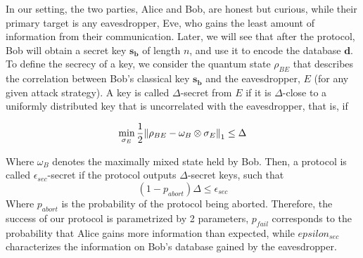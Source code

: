 \documentclass[%
 reprint,
superscriptaddress,
 amsmath,amssymb,
 aps,
]{revtex4-2}
\begin{document}
In our setting, the two parties, Alice and Bob, are honest but curious, while their primary target is any eavesdropper, Eve, who gains the least amount of information from their communication. Later, we will see that after the protocol, Bob will obtain a secret key $\mathbf{s_b}$ of length $n$, and use it to encode the database $\mathbf{d}$. To define the secrecy of a key, we consider the quantum state $\rho_{BE}$ that describes the correlation between Bob’s classical key $\mathbf{s_b}$ and the eavesdropper, $E$ (for any given attack strategy). A key is called $\Delta$-secret from $E$ if it is $\Delta$-close to a uniformly distributed key that is uncorrelated with the eavesdropper, that is, if

\begin{equation}
    \min_{\sigma_E}\frac{1}{2}\norm{\rho_{BE}-\omega_B\otimes\sigma_E}_1\le\Delta
\end{equation}

Where $\omega_B$ denotes the maximally mixed state held by Bob. Then, a protocol is called $\epsilon_{sec}$-secret if the protocol outputs $\Delta$-secret keys, such that
\begin{equation}
    (1-p_{abort})\Delta \le\epsilon_{sec}
\end{equation}
Where $p_{abort}$ is the probability of the protocol being aborted. Therefore, the success of our protocol is parametrized by 2 parameters, $p_{fail}$ corresponds to the probability that Alice gains more information than expected, while $epsilon_{sec}$ characterizes the information on Bob's database gained by the eavesdropper.
\end{document}
